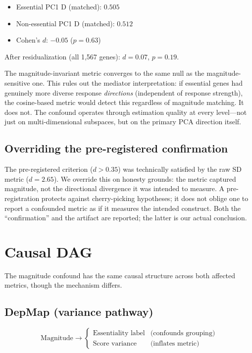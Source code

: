 \documentclass[11pt]{article}
\begin{document}
\begin{itemize}
  \item Essential PC1 D (matched): $0.505$
  \item Non-essential PC1 D (matched): $0.512$
  \item Cohen's $d$: $-0.05$ ($p = 0.63$)
\end{itemize}

After residualization (all 1{,}567 genes): $d = 0.07$, $p = 0.19$.

The magnitude-invariant metric converges to the same null as the
magnitude-sensitive one. This rules out the mediator interpretation: if
essential genes had genuinely more diverse response \emph{directions}
(independent of response strength), the cosine-based metric would detect
this regardless of magnitude matching. It does not. The confound
operates through estimation quality at every level---not just on
multi-dimensional subspaces, but on the primary PCA direction itself.

\subsection{Overriding the pre-registered confirmation}

The pre-registered criterion ($d > 0.35$) was technically satisfied by
the raw SD metric ($d = 2.65$). We override this on honesty grounds: the
metric captured magnitude, not the directional divergence it was
intended to measure. A pre-registration protects against cherry-picking
hypotheses; it does not oblige one to report a confounded metric as if
it measures the intended construct. Both the ``confirmation'' and the
artifact are reported; the latter is our actual conclusion.

\section{Causal DAG}
\label{sec:dag}

The magnitude confound has the same causal structure across both
affected metrics, though the mechanism differs.

\subsection{DepMap (variance pathway)}

\begin{equation*}
\text{Magnitude} \rightarrow
\begin{cases}
\text{Essentiality label} & \text{(confounds grouping)} \\
\text{Score variance} & \text{(inflates metric)}
\end{cases}
\end{equation*}
\end{document}
